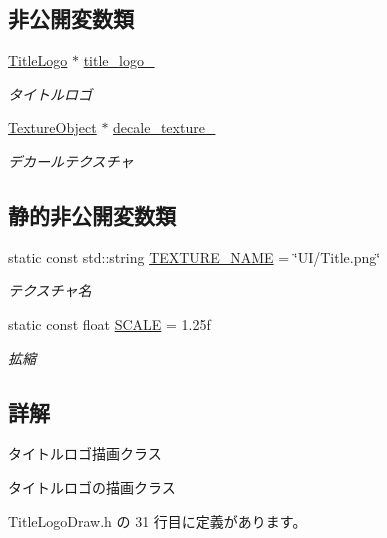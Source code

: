 \subsection*{非公開変数類}
\begin{DoxyCompactItemize}
\item 
\mbox{\hyperlink{class_title_logo}{Title\+Logo}} $\ast$ \mbox{\hyperlink{class_title_logo_draw_a73a6a0f44bd8d9b5dd5c4e31182881d2}{title\+\_\+logo\+\_\+}}
\begin{DoxyCompactList}\small\item\em タイトルロゴ \end{DoxyCompactList}\item 
\mbox{\hyperlink{class_texture_object}{Texture\+Object}} $\ast$ \mbox{\hyperlink{class_title_logo_draw_a84be55e143853754d0b5f21647e3c595}{decale\+\_\+texture\+\_\+}}
\begin{DoxyCompactList}\small\item\em デカールテクスチャ \end{DoxyCompactList}\end{DoxyCompactItemize}
\subsection*{静的非公開変数類}
\begin{DoxyCompactItemize}
\item 
static const std\+::string \mbox{\hyperlink{class_title_logo_draw_a663026976213673c6bcc66533b89ffa1}{T\+E\+X\+T\+U\+R\+E\+\_\+\+N\+A\+ME}} = \char`\"{}UI/Title.\+png\char`\"{}
\begin{DoxyCompactList}\small\item\em テクスチャ名 \end{DoxyCompactList}\item 
static const float \mbox{\hyperlink{class_title_logo_draw_a22181b94dc000a9fb9f68a21af9523ab}{S\+C\+A\+LE}} = 1.\+25f
\begin{DoxyCompactList}\small\item\em 拡縮 \end{DoxyCompactList}\end{DoxyCompactItemize}


\subsection{詳解}
タイトルロゴ描画クラス 

タイトルロゴの描画クラス 

 Title\+Logo\+Draw.\+h の 31 行目に定義があります。



